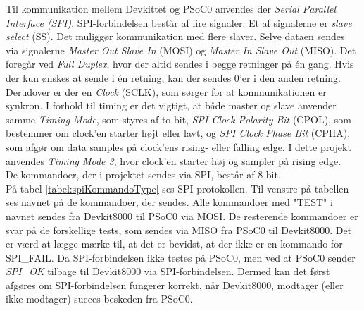 Til kommunikation mellem Devkittet og PSoC0 anvendes der \textit{Serial Parallel Interface (SPI)}. SPI-forbindelsen består af fire signaler. Et af signalerne er \textit{slave select} (SS). Det muliggør kommunikation med flere slaver. Selve dataen sendes via signalerne \textit{Master Out Slave In} (MOSI) og \textit{Master In Slave Out} (MISO). Det foregår ved \textit{Full Duplex}, hvor der altid sendes i begge retninger på én gang. Hvis der kun ønskes at sende i én retning, kan der sendes 0'er i den anden retning. Derudover er der en \textit{Clock} (SCLK), som sørger for at kommunikationen er synkron. I forhold til timing er det vigtigt, at både master og slave anvender samme \textit{Timing Mode}, som styres af to bit, \textit{SPI Clock Polarity Bit} (CPOL), som bestemmer om clock'en starter højt eller lavt, og \textit{SPI Clock Phase Bit} (CPHA), som afgør om data samples på clock'ens rising- eller falling edge. I dette projekt anvendes \textit{Timing Mode 3}, hvor clock'en starter høj og sampler på rising edge. \\
De kommandoer, der i projektet sendes via SPI, består af 8 bit. \\
På tabel \ref{tabel:spiKommandoType} ses SPI-protokollen. Til venstre på tabellen ses navnet på de kommandoer, der sendes. Alle kommandoer med "TEST" i navnet sendes fra Devkit8000 til PSoC0 via MOSI. De resterende kommandoer er svar på de forskellige tests, som sendes via MISO fra PSoC0 til Devkit8000. Det er værd at lægge mærke til, at det er bevidst, at der ikke er en kommando for SPI\_FAIL. Da SPI-forbindelsen ikke testes på PSoC0, men ved at PSoC0 sender \textit{SPI\_OK} tilbage til Devkit8000 via SPI-forbindelsen. Dermed kan det først afgøres om SPI-forbindelsen fungerer korrekt, når Devkit8000, modtager (eller ikke modtager) succes-beskeden fra PSoC0. \\


